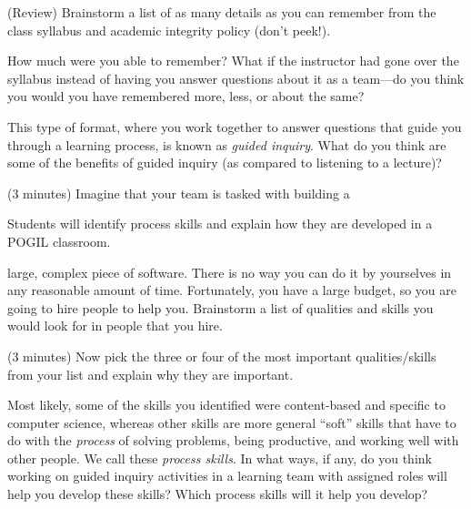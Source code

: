 \documentclass{tufte-handout}
\begin{document}
\begin{questions}
\item (Review) Brainstorm a list of as many details as you can
  remember from the class syllabus and academic integrity
  policy (don't peek!).  \vspace{1in}

\item How much were you able to remember?  What if the instructor had
  gone over the syllabus instead of having you answer questions about
  it as a team---do you think you would you have remembered more,
  less, or about the same? \vspace{0.5in}

\item This type of format, where you work together to answer questions
  that guide you through a learning process, is known as \emph{guided
    inquiry}.  What do you think are some of the benefits of guided
  inquiry (as compared to listening to a lecture)?  

\newpage

\item (3 minutes) Imagine that your team is tasked with building a
\begin{objective}
  Students will identify process skills and explain how they are
  developed in a POGIL classroom.
\end{objective}
  large, complex piece of software.  There is no way you can do it by
  yourselves in any reasonable amount of time.  Fortunately, you have
  a large budget, so you are going to hire people to help
  you. Brainstorm a list of qualities and skills you would look for in
  people that you hire.

  \vspace{1in}
\item (3 minutes) Now pick the three or four of the most important
  qualities/skills from your list and explain why they are important.
  \vspace{1in}

\item Most likely, some of the skills you identified were
  content-based and specific to computer science, whereas other skills
  are more general ``soft'' skills that have to do with the
  \emph{process} of solving problems, being productive, and working
  well with other people.  We call these \emph{process skills}.  In
  what ways, if any, do you think working on guided inquiry activities
  in a learning team with assigned roles will help you develop these
  skills?  Which process skills will it help you develop?

\end{questions}
\end{document}
